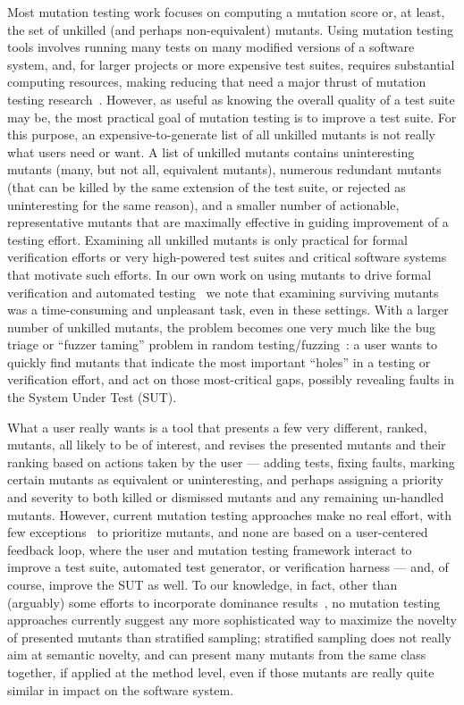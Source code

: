 Most mutation testing work focuses on computing a mutation score or, at least, the set of unkilled (and perhaps non-equivalent) mutants.  Using mutation testing tools involves running many tests on many modified versions of a software system, and, for larger projects or more expensive test suites, requires substantial computing resources, making reducing that need a major thrust of mutation testing research~\cite{jia2011analysis}.  However, as useful as knowing the overall quality of a test suite may be, the most practical goal of mutation testing is to improve a test suite.  For this purpose, an expensive-to-generate list of all unkilled mutants is not really what users need or want.  A list of unkilled mutants contains uninteresting mutants (many, but not all, equivalent mutants), numerous redundant mutants (that can be killed by the same extension of the test suite, or rejected as uninteresting for the same reason), and a smaller number of actionable, representative mutants that are maximally effective in guiding improvement of a testing effort.  Examining all unkilled mutants is only practical for formal verification efforts or very high-powered test suites and critical software systems that motivate such efforts.  In our own work on using mutants to drive formal verification and automated testing~\cite{groce2015verified,groce2018verified,mutKernel} we note that examining surviving mutants was a time-consuming and unpleasant task, even in these settings.  With a larger number of unkilled mutants, the problem becomes one very much like the bug triage or ``fuzzer taming'' problem in random testing/fuzzing~\cite{PLDI13,SemCrash}:  a user wants to quickly find mutants that indicate the most important ``holes'' in a testing or verification effort, and act on those most-critical gaps, possibly revealing faults in the System Under Test (SUT).

What a user really wants is a tool that presents a few very different, ranked, mutants, all likely to be of interest, and revises the presented mutants and their ranking based on actions taken by the user --- adding tests, fixing faults, marking certain mutants as equivalent or uninteresting, and perhaps assigning a priority and severity to both killed or dismissed mutants and any remaining un-handled mutants. However, current mutation testing approaches make no real effort, with few exceptions~\cite{MutGoogle,FaRM} to prioritize mutants, and none are based on a user-centered feedback loop, where the user and mutation testing framework interact to improve a test suite, automated test generator, or verification harness --- and, of course, improve the SUT as well.  To our knowledge, in fact, other than (arguably) some efforts to incorporate dominance results~\cite{MutQuality}, no mutation testing approaches currently suggest any more sophisticated way to maximize the novelty of presented mutants than stratified sampling; stratified sampling does not really aim at semantic novelty, and can present many mutants from the same class together, if applied at the method level, even if those mutants are really quite similar in impact on the software system.

